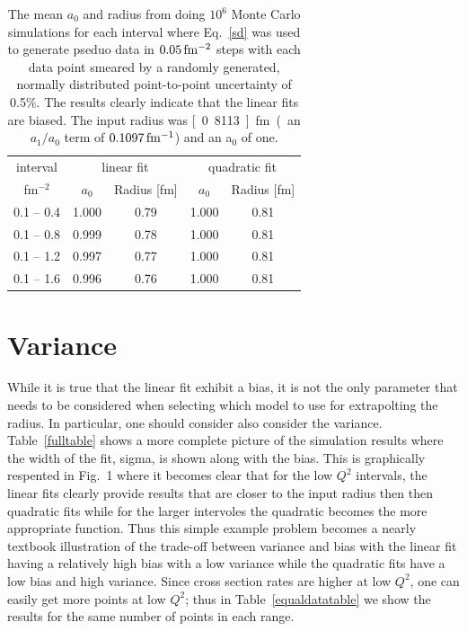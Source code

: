 \documentclass[10pt,aps,prc,twocolumn]{revtex4-1}
\begin{document}
\begin{table}
\caption{The mean $a_0$ and radius from doing $10^6$ Monte Carlo simulations
for each interval
where Eq.~\ref{sd} was used to generate pseduo data in $\unit[0.05]{fm^{-2}}$ steps
with each data point smeared by a randomly generated, normally distributed point-to-point 
uncertainty of 0.5\%.
The results clearly indicate that the linear fits are biased.   The input
radius was \unit[0.8113]{fm} (an $a_1/a_0$ term of $\unit[0.1097]{fm^{-1}}$) and an a$_0$ of one.}
\begin{tabular}{c|cc|cc} \hline
interval       & \multicolumn{2}{c|}{linear fit} & \multicolumn{2}{c}{quadratic fit}  \\
fm$^{-2}$      & $a_0$      & Radius [fm]          & $a_0$    & Radius [fm] \\ \hline
 0.1 -- 0.4 & 1.000& 0.79& 1.000& 0.81 \\
 0.1 -- 0.8 & 0.999& 0.78& 1.000& 0.81 \\
 0.1 -- 1.2 & 0.997& 0.77& 1.000& 0.81 \\
 0.1 -- 1.6 & 0.996& 0.76& 1.000& 0.81 \\ \hline
\end{tabular}
\label{ztable}
\end{table}


\section{Variance}

While it is true that the linear fit exhibit a bias, it is not the only parameter that needs
to be considered when selecting which model to use for extrapolting the radius.
In particular, one should consider also consider the variance.
Table~\ref{fulltable} shows a more complete picture of the simulation results 
where the width of the fit, sigma, is 
shown along with the bias.   This is graphically respented in Fig.~1 where it becomes clear that 
for the low $Q^2$ intervals, the linear fits clearly provide results that are closer to
the input radius then then quadratic fits while for the larger intervoles the quadratic becomes
the more appropriate function.
Thus this simple example problem becomes a nearly textbook illustration of the trade-off between 
variance and bias with the linear fit having a relatively high bias with a low variance while the 
quadratic fits have a low bias and high variance.
Since cross section rates are higher at low $Q^2$, one can easily get more points at low $Q^2$; thus in 
Table~\ref{equaldatatable} we show the results for the same number of points in each range.
\end{document}
